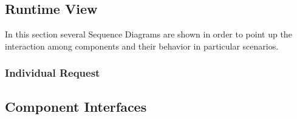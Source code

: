 \subsection{Runtime View}
In this section several Sequence Diagrams are shown in order to point up the interaction among components and their behavior in particular scenarios.

\subsubsection{Individual Request}

\subsubsection{}
\subsubsection{}


\subsection{Component Interfaces}

